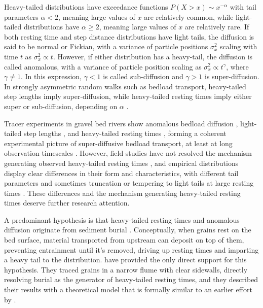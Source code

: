 \documentclass[draft]{agujournal2018}
\begin{document}
Heavy-tailed distributions have exceedance functions $P(X>x) \sim x^{-\alpha}$ with tail parameters $\alpha < 2$, meaning large values of $x$ are relatively common, while light-tailed distributions have $\alpha \geq 2$, meaning large values of $x$ are relatively rare.
If both resting time and step distance distributions have light tails, the diffusion is said to be normal or Fickian, with a variance of particle positions $\sigma_x^2$
scaling with time $t$ as $\sigma_x^2 \propto t$.
However, if either distribution has a heavy-tail, the diffusion is called anomalous, with a variance of particle position scaling as $\sigma_x^2 \propto t^\gamma$, where $\gamma\neq 1$.
In this expression, $\gamma <1$ is called sub-diffusion and $\gamma > 1$ is super-diffusion.
In strongly asymmetric random walks such as bedload transport, heavy-tailed step lengths imply super-diffusion, while heavy-tailed resting times imply either super or sub-diffusion, depending on $\alpha$ \citep{Weeks1996, Weeks1998}.

Tracer experiments in gravel bed rivers show anomalous bedload diffusion \citep{Phillips2013, Bradley2017}, light-tailed step lengths \citep{Bradley2012, Hassan2013}, and heavy-tailed resting times \citep{Voepel2013, Olinde2015, Pretzlav2016, Bradley2017}, forming a coherent experimental picture of super-diffusive bedload transport, at least at long observation timescales \citep[e.g.][]{Nikora2002, Martin2012}.
However, field studies have not resolved the mechanism generating observed heavy-tailed resting times \citep[e.g.][]{Bradley2017}, and empirical distributions display clear differences in their form and characteristics, with different tail parameters \citep[e.g.][]{Olinde2015} and sometimes truncation \citep[e.g.][]{Bradley2017} or tempering to light tails at large resting times \citep[e.g.][]{Voepel2013}.
These differences and the mechanism generating heavy-tailed resting times deserve further research attention.

A predominant hypothesis is that heavy-tailed resting times and anomalous diffusion originate from sediment burial \citep{Voepel2013,Martin2014,Wu2019}.
Conceptually, when grains rest on the bed surface, material transported from upstream can deposit on top of them, preventing entrainment until it's removed, driving up resting times and imparting a heavy tail to the distribution.
\citet{Martin2014} have provided the only direct support for this hypothesis.
They traced grains in a narrow flume with clear sidewalls, directly resolving burial as the generator of heavy-tailed resting times, and they described their results with a theoretical model that is formally similar to an earlier effort by \citet{Voepel2013}.
\end{document}
